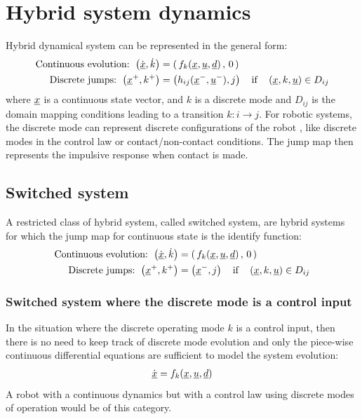 {\section{Hybrid system dynamics}

Hybrid dynamical system can be represented in the general form:
%
\begin{align}
\text{Continuous evolution: } \left(  \dot{\underline{x}} , \dot{k} \right) &=  \left( \, f_k( \underline{x} , \underline{u} , \underline{d} ) \, , \, 0 \, \right) \\
\text{Discrete jumps: } \left(  \underline{x}^+ , k^+ \right) &=  \left( h_{ij}( \underline{x}^- , \underline{u}^- ) , j \right) \quad\text{if}\quad \left(  \underline{x} , k , \underline{u} \right) \in D_{ij}  
\end{align}
%
where $\underline{x}$ is a continuous state vector, and $k$ is a discrete mode and $D_{ij}$ is the domain mapping conditions leading to a transition $k:i \rightarrow j$. For robotic systems, the discrete mode can represent discrete configurations of the robot , like discrete modes in the control law or contact/non-contact conditions. The jump map then represents the impulsive response when contact is made. 

\subsection{Switched system}

A restricted class of hybrid system, called switched system, are hybrid systems for which the jump map for continuous state is the identify function:
%
\begin{align}
\text{Continuous evolution: } \left(  \dot{\underline{x}} , \dot{k} \right) &=  \left( \, f_k( \underline{x} , \underline{u} , \underline{d} ) \, , \, 0 \, \right) \\
\text{Discrete jumps: } \left(  \underline{x}^+ , k^+ \right) &=  \left( \underline{x}^- , j \right) \quad\text{if}\quad \left(  \underline{x} , k , \underline{u} \right) \in D_{ij} 
\end{align}
%

\subsubsection{Switched system where the discrete mode is a control input}

In the situation where the discrete operating mode $k$ is a control input, then there is no need to keep track of discrete mode evolution and only the piece-wise continuous differential equations are sufficient to model the system evolution:
%
\begin{align}
\dot{\underline{x}} = f_k( \underline{x} , \underline{u} , \underline{d} ) 
\end{align}
%
A robot with a continuous dynamics but with a control law using discrete modes of operation would be of this category. 


}{}